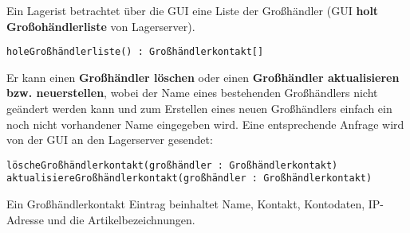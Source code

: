 Ein Lagerist betrachtet über die GUI eine Liste der Großhändler (GUI \textbf{holt Großohändlerliste} von Lagerserver).

\texttt{holeGroßhändlerliste() : Großhändlerkontakt[]}

Er kann einen \textbf{Großhändler löschen} oder einen \textbf{Großhändler aktualisieren bzw. neuerstellen}, wobei der Name eines bestehenden Großhändlers nicht geändert werden kann und zum Erstellen eines neuen Großhändlers einfach ein noch nicht vorhandener Name eingegeben wird.
Eine entsprechende Anfrage wird von der GUI an den Lagerserver gesendet:

\texttt{löscheGroßhändlerkontakt(großhändler : Großhändlerkontakt)} \\
\texttt{aktualisiereGroßhändlerkontakt(großhändler : Großhändlerkontakt)}

Ein Großhändlerkontakt Eintrag beinhaltet Name, Kontakt, Kontodaten, IP-Adresse und die Artikelbezeichnungen.